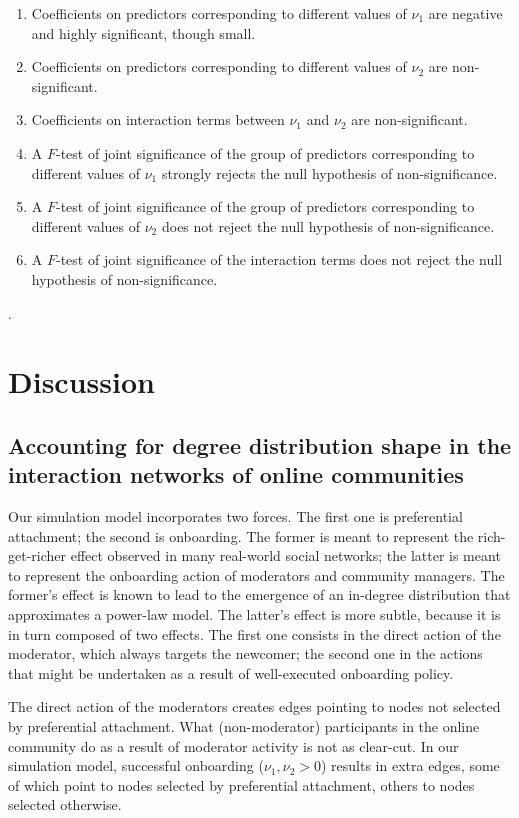 \documentclass{bmcart}
\begin{document}
\begin{enumerate}
\item Coefficients on predictors corresponding to different values of $\nu_1$ are negative and highly significant, though small.
\item Coefficients on predictors corresponding to different values of $\nu_2$ are non-significant.
\item Coefficients on interaction terms between $\nu_1$ and $\nu_2$ are non-significant.
\item A $F$-test of joint significance of the group of predictors corresponding to different values of $\nu_1$ strongly rejects the null hypothesis of non-significance. 
\item A $F$-test of joint significance of the group of predictors corresponding to different values of $\nu_2$ does not reject the null hypothesis of non-significance.
\item A $F$-test of joint significance of the interaction terms does not reject the null hypothesis of non-significance.
\end{enumerate}.

\section*{Discussion}

\subsection*{Accounting for degree distribution shape in the interaction networks of online communities}

Our simulation model incorporates two forces. The first one is preferential attachment; the second is onboarding. The former is meant to represent the rich-get-richer effect observed in many real-world social networks; the latter is meant to represent the onboarding action of moderators and community managers. The former's effect is known to lead to the emergence of an in-degree distribution that approximates a power-law model. The latter's effect is more subtle, because it is in turn composed of two effects. The first one consists in the direct action of the moderator, which  always targets the newcomer; the second one in the actions that might be undertaken as a result of well-executed onboarding policy. 

The direct action of the moderators creates edges pointing to nodes not selected by preferential attachment. What (non-moderator) participants in the online community do as a result of moderator activity is not as clear-cut. In our simulation model, successful onboarding ($\nu_1, \nu_2 > 0$) results in extra edges, some of which point to nodes selected by preferential attachment, others to nodes selected otherwise. 
\end{document}
